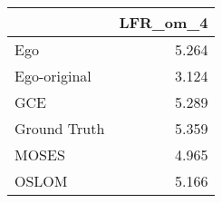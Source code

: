 \begin{tabular}{lr}
\toprule
{} & LFR_om_4 \\
\midrule
Ego          &    5.264 \\
Ego-original &    3.124 \\
GCE          &    5.289 \\
Ground Truth &    5.359 \\
MOSES        &    4.965 \\
OSLOM        &    5.166 \\
\bottomrule
\end{tabular}
